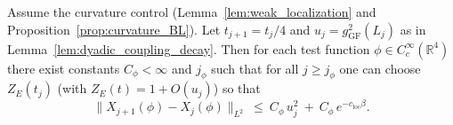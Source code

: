 \begin{lemma}\label{lem:one_shell_increment}
Assume the curvature control (Lemma~\ref{lem:weak_localization} and Proposition~\ref{prop:curvature_BL}).
Let $t_{j+1}=t_j/4$ and $u_j=g_{\mathrm{GF}}^2(L_j)$ as in Lemma~\ref{lem:dyadic_coupling_decay}.
Then for each test function $\phi\in C_c^\infty(\mathbb R^4)$ there exist constants $C_\phi<\infty$ and $j_\phi$ such that for all
$j\ge j_\phi$ one can choose $Z_E(t_j)$ (with $Z_E(t)=1+O(u_j)$) so that
\begin{equation}\label{eq:one_shell_bound}
 \|X_{j+1}(\phi)-X_j(\phi)\|_{L^2}\ \le\ C_\phi\,u_j^2 \ +\ C_\phi\,e^{-c_{\mathrm{loc}}\beta}.
\end{equation}
\end{lemma}

